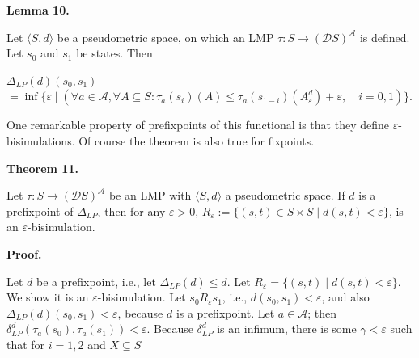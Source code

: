 \documentclass[10pt,a4paper]{article}
\begin{document}
 
 
\par\medskip\noindent\textbf{Lemma 10.}\par
 
 
Let $\langle S,d\rangle$ be a pseudometric space, on which an LMP $\tau:S\to(\mathcal{D}S)^{\mathcal{A}}$ is defined. Let $s_{0}$ and $s_{1}$ be states. Then\par
  
\par  \quad  $\displaystyle\Delta_{LP}(d)(s_{0},s_{1})$\quad  $\displaystyle=\inf\{\varepsilon\mid(\forall a\in\mathcal{A},\forall A\subseteq
S:\tau_{a}(s_{i})(A)\leq\tau_{a}(s_{1-i})(A^{d}_{\varepsilon})+\varepsilon,\quad i=0,1)\}.$\quad  \quad  
  
 
 
 
One remarkable property of prefixpoints of this functional is that they define $\varepsilon$-bisimulations. Of course the theorem is also true for fixpoints.\par
 
 
 
\par\medskip\noindent\textbf{Theorem 11.}\par
 
 
Let $\tau:S\to(\mathcal{D}S)^{\mathcal{A}}$ be an LMP with $\langle S,d\rangle$ a pseudometric space. If $d$ is a prefixpoint of $\Delta_{LP}$, then for any $\varepsilon>0$, $R_{\varepsilon}:=\{(s,t)\in S\times S\mid d(s,t)<\varepsilon\}$, is an $\varepsilon$-bisimulation.\par
 
 
 
 
\par\medskip\noindent\textbf{Proof.}\par
 
 
Let $d$ be a prefixpoint, i.e., let $\Delta_{LP}(d)\leq d$. Let $R_{\varepsilon}=\{(s,t)\mid d(s,t)<\varepsilon\}$. We show it is an $\varepsilon$-bisimulation. Let $s_{0}R_{\varepsilon}s_{1}$, i.e., $d(s_{0},s_{1})<\varepsilon$, and also $\Delta_{LP}(d)(s_{0},s_{1})<\varepsilon$, because $d$ is a prefixpoint. Let $a\in\mathcal{A}$; then $\delta_{LP}^{d}(\tau_{a}(s_{0}),\tau_{a}(s_{1}))<\varepsilon$. Because $\delta_{LP}^{d}$ is an infimum, there is some $\gamma<\varepsilon$ such that for $i=1,2$ and $X\subseteq S$\par
  
\end{document}
